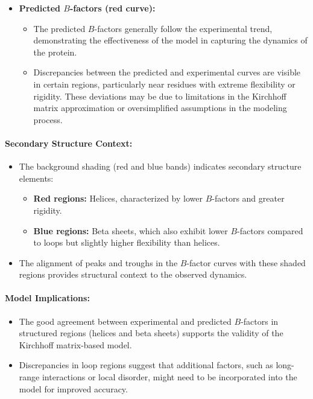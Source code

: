 \documentclass[English, Lau, oneside]{sapthesis}
\begin{document}
\begin{itemize}
\begin{itemize}
    \item \textbf{Predicted \( B \)-factors (red curve):}
    \begin{itemize}
        \item The predicted \( B \)-factors generally follow the experimental trend, demonstrating the effectiveness of the model in capturing the dynamics of the protein.
        \item Discrepancies between the predicted and experimental curves are visible in certain regions, particularly near residues with extreme flexibility or rigidity. These deviations may be due to limitations in the Kirchhoff matrix approximation or oversimplified assumptions in the modeling process.
    \end{itemize}
\end{itemize}

\paragraph{Secondary Structure Context:}
\begin{itemize}
    \item The background shading (red and blue bands) indicates secondary structure elements:
    \begin{itemize}
        \item \textbf{Red regions:} Helices, characterized by lower \( B \)-factors and greater rigidity.
        \item \textbf{Blue regions:} Beta sheets, which also exhibit lower \( B \)-factors compared to loops but slightly higher flexibility than helices.
    \end{itemize}
    \item The alignment of peaks and troughs in the \( B \)-factor curves with these shaded regions provides structural context to the observed dynamics.
\end{itemize}

\paragraph{Model Implications:}
\begin{itemize}
    \item The good agreement between experimental and predicted \( B \)-factors in structured regions (helices and beta sheets) supports the validity of the Kirchhoff matrix-based model.
    \item Discrepancies in loop regions suggest that additional factors, such as long-range interactions or local disorder, might need to be incorporated into the model for improved accuracy.
\end{itemize}


\end{itemize}
\end{document}
